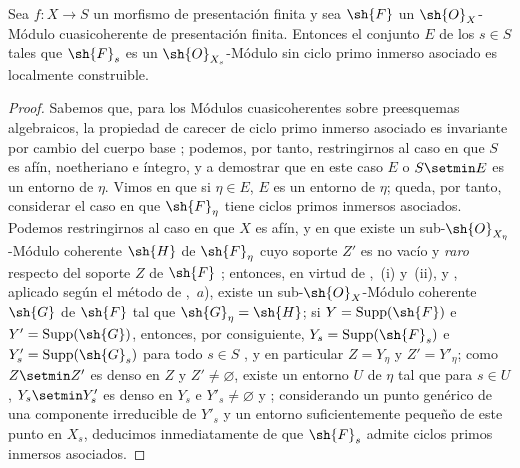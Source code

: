 \begin{proposition}[9.8.1]
\label{IV.9.8.1}
Sea $f:X\to S$ un morfismo de presentación finita y sea $\sh{F}$ un $\sh{O}_X$-Módulo cuasicoherente de presentación finita.
Entonces el conjunto $E$ de los $s\in S$ tales que $\sh{F}_s$ es un $\sh{O}_{X_s}$-Módulo sin ciclo primo inmerso asociado es localmente construible.
\end{proposition}

\begin{proof}
\label{IV.9.8.1-proof}
Sabemos que, para los Módulos cuasicoherentes sobre preesquemas algebraicos, la propiedad de carecer de ciclo primo inmerso asociado es invariante por cambio del cuerpo base ; podemos, por tanto, restringirnos al caso en que $S$ es afín, noetheriano e íntegro, y a demostrar que en este caso $E$ o $S\setmin E$ es un entorno de $\eta$.
Vimos en  que si $\eta\in E$, $E$ es un entorno de $\eta$; queda, por tanto, considerar el caso en que $\sh{F}_\eta$ tiene ciclos primos inmersos asociados.
Podemos restringirnos al caso en que $X$ es afín, y en que existe un sub-$\sh{O}_{X_\eta}$-Módulo coherente $\sh{H}$ de $\sh{F}_\eta$ cuyo soporte $Z'$ es no vacío y \emph{raro} respecto del soporte $Z$ de $\sh{F}$ ; entonces, en virtud de ,~(i) y~(ii),
y , aplicado según el método de ,~$a$), existe un sub-$\sh{O}_X$-Módulo coherente $\sh{G}$ de $\sh{F}$ tal que $\sh{G}_\eta=\sh{H}$; si $Y=\operatorname{Supp}(\sh{F})$ e $Y'=\operatorname{Supp}(\sh{G})$, entonces, por consiguiente, $Y_s=\operatorname{Supp}(\sh{F}_s)$ e $Y'_s=\operatorname{Supp}(\sh{G}_s)$ para todo $s\in S$ , y en particular $Z=Y_\eta$ y $Z'=Y'_\eta$; como $Z\setmin Z'$ es denso en $Z$ y $Z'\neq\varnothing$, existe un entorno $U$ de $\eta$ tal que para $s\in U$, $Y_s\setmin Y'_s$ es denso en $Y_s$ e $Y'_s\neq\varnothing$  y ; considerando un punto genérico de una componente irreducible de $Y'_s$ y un entorno suficientemente pequeño de este punto en $X_s$, deducimos inmediatamente de  que $\sh{F}_s$ admite ciclos primos inmersos asociados.
\end{proof}

